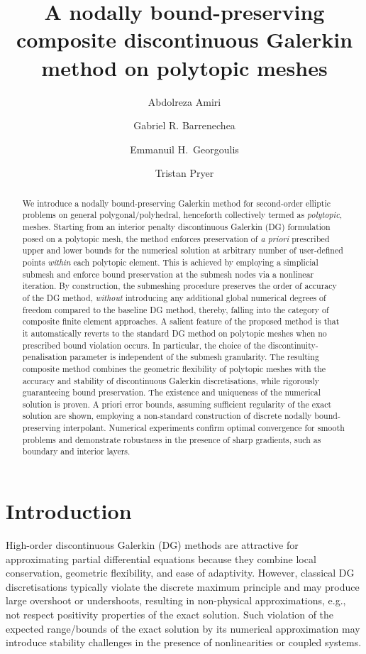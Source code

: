 \documentclass[11pt,final]{amsart}
\title[Composite Nodally bound-preserving DG methods on polytopic meshes]{A nodally bound-preserving  composite discontinuous Galerkin method  on polytopic meshes}
\author[A.~Amiri]{Abdolreza  Amiri}
\author[G.R.~Barrenechea]{Gabriel R. Barrenechea}
\author[E.H.~Georgoulis]{Emmanuil H.~Georgoulis}
\author[T.~Pryer]{Tristan Pryer}
\theoremstyle{plain}
\theoremstyle{definition}
\begin{document}
\maketitle

\begin{abstract}
 We introduce a nodally
bound-preserving Galerkin method for second-order elliptic
problems on general polygonal/polyhedral, henceforth collectively termed as \emph{polytopic}, meshes.  Starting
from an interior penalty discontinuous Galerkin (DG) formulation posed on a
polytopic mesh, the method enforces preservation of \emph{a priori} prescribed upper and lower bounds for the numerical solution at arbitrary number of user-defined points \emph{within} each polytopic element. This is achieved by employing a simplicial submesh and enforce bound preservation at the submesh nodes via a nonlinear iteration. By construction, the submeshing procedure preserves the order of accuracy of the DG method, \emph{without} introducing any additional global numerical degrees of freedom compared to the baseline DG method, thereby, falling into the category of composite finite element approaches. A salient feature of the proposed method is that it automatically reverts to the standard DG method on polytopic meshes when no prescribed bound violation occurs. In particular, the choice of the discontinuity-penalisation parameter is independent of the submesh granularity. The resulting composite method combines the geometric
flexibility of polytopic meshes with the accuracy and stability of
discontinuous Galerkin discretisations, while rigorously guaranteeing
bound preservation.  The existence and uniqueness of the numerical solution is proven. A priori error bounds, assuming sufficient regularity of the exact solution are shown, employing a non-standard construction of discrete nodally bound-preserving interpolant. Numerical experiments confirm optimal convergence for
smooth problems and demonstrate robustness in the presence of sharp gradients, such as boundary
and interior layers.
\end{abstract}

\section{Introduction}
\label{sec:intro}

High-order discontinuous Galerkin (DG) methods are attractive for
approximating partial differential equations because they combine
local conservation, geometric flexibility, and ease of
adaptivity. However, classical DG discretisations typically violate the
discrete maximum principle and may produce large overshoot or undershoots, resulting in non-physical approximations, e.g., not respect positivity properties of the exact solution. Such violation of the expected range/bounds of the exact solution by its numerical approximation may introduce stability challenges in the presence of nonlinearities or coupled systems.
\end{document}
